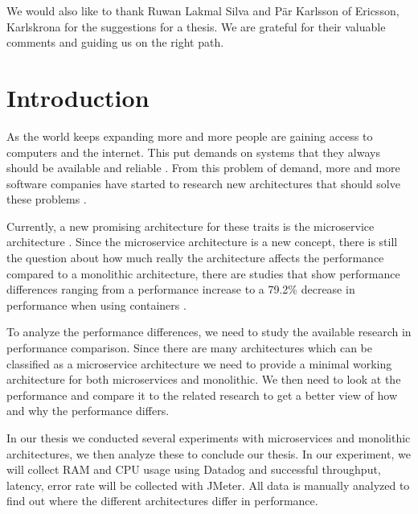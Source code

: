\documentclass[a4paper,oneside]{bth}
\begin{document}
\par\vspace{0.5cm}
We would also like to thank Ruwan Lakmal Silva and Pär Karlsson of Ericsson, Karlskrona for the suggestions for a thesis. We are grateful for their valuable comments and guiding us on the right path.
\tableofcontents 

\cleardoublepage
\pagestyle{headings}

\chapter{Introduction}

As the world keeps expanding more and more people are gaining access to computers and the internet. This put demands on systems that they always should be available and reliable \cite{Bondi}. From this problem of demand, more and more software companies have started to research new architectures that should solve these problems \cite{farrow-netflix}.

\par\vspace {0.5cm}
Currently, a new promising architecture for these traits is the microservice architecture \cite{Fowler}. Since the microservice architecture is a new concept, there is still the question about how much really the architecture affects the performance compared to a monolithic architecture, there are studies that show performance differences ranging from a performance increase to a 79.2\% decrease in performance when using containers \cite{Joy, Ueda}.

\par\vspace {0.5cm}
To analyze the performance differences, we need to study the available research in performance comparison. Since there are many architectures which can be classified as a microservice architecture we need to provide a minimal working architecture for both microservices and monolithic. We then need to look at the performance and compare it to the related research to get a better view of how and why the performance differs.

\par\vspace {0.5cm}
In our thesis we conducted several experiments with microservices and monolithic architectures, we then analyze these to conclude our thesis. In our experiment, we will collect RAM and CPU usage using Datadog and successful throughput, latency, error rate will be collected with JMeter. All data is manually analyzed to find out where the different architectures differ in performance.
\end{document}
